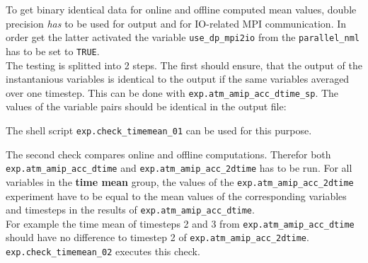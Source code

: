 To get binary identical data for online and offline computed mean values, double precision \emph{has} to be used for output and for IO-related MPI communication. In order get the latter activated the variable \texttt{use\_dp\_mpi2io} from the \texttt{parallel\_nml} has to be set to \texttt{TRUE}.\\
The testing is splitted into 2 steps. The first should ensure, that the output of the instantanious variables is identical to the output if the same variables averaged over one timestep. This can be done with \texttt{exp.atm\_amip\_acc\_dtime\_sp}. The values of the variable pairs should be identical in the output file:
\begin{table}[h]
\end{table}
The shell script \texttt{exp.check\_timemean\_01} can be used for this purpose.

The second check compares online and offline computations. Therefor both \texttt{exp.atm\_amip\_acc\_dtime} and \texttt{exp.atm\_amip\_acc\_2dtime} has to be run. For all variables in the \textbf{time mean} group, the values of the \texttt{exp.atm\_amip\_acc\_2dtime} experiment have to be equal to the mean values of the corresponding variables and timesteps in the results of \texttt{exp.atm\_amip\_acc\_dtime}.\\For example the time mean of timesteps 2 and 3 from \texttt{exp.atm\_amip\_acc\_dtime} should have no difference to timestep 2 of \texttt{exp.atm\_amip\_acc\_2dtime}. \texttt{exp.check\_timemean\_02} executes this check.

